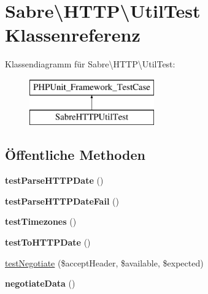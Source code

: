 \hypertarget{class_sabre_1_1_h_t_t_p_1_1_util_test}{}\section{Sabre\textbackslash{}H\+T\+TP\textbackslash{}Util\+Test Klassenreferenz}
\label{class_sabre_1_1_h_t_t_p_1_1_util_test}
Klassendiagramm für Sabre\textbackslash{}H\+T\+TP\textbackslash{}Util\+Test\+:\begin{figure}[H]
\begin{center}
\leavevmode
\includegraphics[height=2.000000cm]{class_sabre_1_1_h_t_t_p_1_1_util_test}
\end{center}
\end{figure}
\subsection*{Öffentliche Methoden}
\begin{DoxyCompactItemize}
\item 
\mbox{\label{class_sabre_1_1_h_t_t_p_1_1_util_test_a0490fc892007e1fabe21f22a3187f853}} 
{\bfseries test\+Parse\+H\+T\+T\+P\+Date} ()
\item 
\mbox{\label{class_sabre_1_1_h_t_t_p_1_1_util_test_adf449849eed17f948ffd4c8ee6516742}} 
{\bfseries test\+Parse\+H\+T\+T\+P\+Date\+Fail} ()
\item 
\mbox{\label{class_sabre_1_1_h_t_t_p_1_1_util_test_afe099d8d005b692f6076f1fc8e59e266}} 
{\bfseries test\+Timezones} ()
\item 
\mbox{\label{class_sabre_1_1_h_t_t_p_1_1_util_test_aa0de13ee9d9166ab3eb4f396d532f0c9}} 
{\bfseries test\+To\+H\+T\+T\+P\+Date} ()
\item 
\mbox{\hyperlink{class_sabre_1_1_h_t_t_p_1_1_util_test_a2968b70c61c55577735f270ed0839028}{test\+Negotiate}} (\$accept\+Header, \$available, \$expected)
\item 
\mbox{\label{class_sabre_1_1_h_t_t_p_1_1_util_test_a65b199d5fdf853e370ea0184f0861c92}} 
{\bfseries negotiate\+Data} ()
\end{DoxyCompactItemize}



